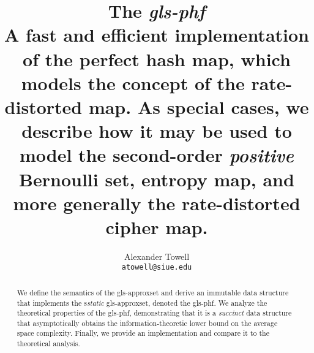 \documentclass[11pt,final,hidelinks]{article}
\title
{
    The \emph{\gls*{gls-phf}}\\
    \large A fast and efficient implementation of the perfect hash map, which models the concept of the rate-distorted map.
    As special cases, we describe how it may be used to model the second-order \emph{positive} Bernoulli set, entropy map, and more generally the rate-distorted cipher map.
}
\author
{
    Alexander Towell\\
    \texttt{atowell@siue.edu}
}
\date{}
\begin{document}
\maketitle
\begin{abstract}
We define the semantics of the \gls*{gls-approxset} and derive an immutable data structure that implements the s\emph{static} \gls*{gls-approxset}, denoted the \gls*{gls-phf}. We analyze the theoretical properties of the \gls*{gls-phf}, demonstrating that it is a \emph{succinct} data structure that asymptotically obtains the information-theoretic lower bound on the average space complexity. Finally, we provide an implementation and compare it to the theoretical analysis.
\end{abstract}

\tableofcontents





\printglossary

\end{document}
